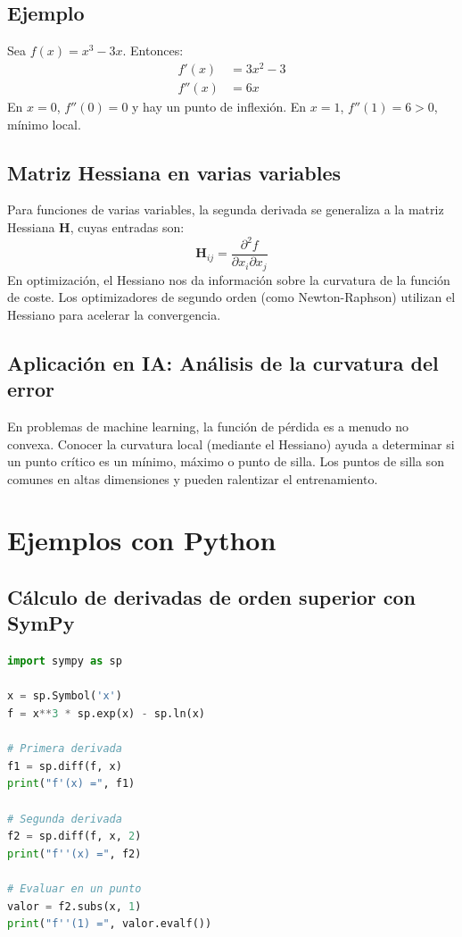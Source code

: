 \documentclass[12pt,a4paper,openany,oneside]{book}
\begin{document}
\subsection{Ejemplo}
Sea $f(x) = x^3 - 3x$. Entonces:
\begin{align*}
f'(x) &= 3x^2 - 3 \\
f''(x) &= 6x
\end{align*}
En $x=0$, $f''(0)=0$ y hay un punto de inflexión. En $x=1$, $f''(1)=6>0$, mínimo local.

\subsection{Matriz Hessiana en varias variables}
Para funciones de varias variables, la segunda derivada se generaliza a la matriz Hessiana $\mathbf{H}$, cuyas entradas son:
\[
\mathbf{H}_{ij} = \frac{\partial^2 f}{\partial x_i \partial x_j}
\]
En optimización, el Hessiano nos da información sobre la curvatura de la función de coste. Los optimizadores de segundo orden (como Newton-Raphson) utilizan el Hessiano para acelerar la convergencia.

\subsection{Aplicación en IA: Análisis de la curvatura del error}
En problemas de machine learning, la función de pérdida es a menudo no convexa. Conocer la curvatura local (mediante el Hessiano) ayuda a determinar si un punto crítico es un mínimo, máximo o punto de silla. Los puntos de silla son comunes en altas dimensiones y pueden ralentizar el entrenamiento.

\section{Ejemplos con Python}

\subsection{Cálculo de derivadas de orden superior con SymPy}
\begin{lstlisting}[language=Python]
import sympy as sp

x = sp.Symbol('x')
f = x**3 * sp.exp(x) - sp.ln(x)

# Primera derivada
f1 = sp.diff(f, x)
print("f'(x) =", f1)

# Segunda derivada
f2 = sp.diff(f, x, 2)
print("f''(x) =", f2)

# Evaluar en un punto
valor = f2.subs(x, 1)
print("f''(1) =", valor.evalf())
\end{lstlisting}
\end{document}
